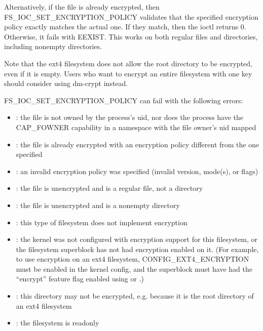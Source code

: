\documentclass[a4paper,8pt,english]{sphinxmanual}
\begin{document}
Alternatively, if the file is already encrypted, then
FS\_IOC\_SET\_ENCRYPTION\_POLICY validates that the specified encryption
policy exactly matches the actual one.  If they match, then the ioctl
returns 0.  Otherwise, it fails with EEXIST.  This works on both
regular files and directories, including nonempty directories.

Note that the ext4 filesystem does not allow the root directory to be
encrypted, even if it is empty.  Users who want to encrypt an entire
filesystem with one key should consider using dm-crypt instead.

FS\_IOC\_SET\_ENCRYPTION\_POLICY can fail with the following errors:
\begin{itemize}
\item {} 
: the file is not owned by the process's uid, nor does the
process have the CAP\_FOWNER capability in a namespace with the file
owner's uid mapped

\item {} 
: the file is already encrypted with an encryption policy
different from the one specified

\item {} 
: an invalid encryption policy was specified (invalid
version, mode(s), or flags)

\item {} 
: the file is unencrypted and is a regular file, not a
directory

\item {} 
: the file is unencrypted and is a nonempty directory

\item {} 
: this type of filesystem does not implement encryption

\item {} 
: the kernel was not configured with encryption
support for this filesystem, or the filesystem superblock has not
had encryption enabled on it.  (For example, to use encryption on an
ext4 filesystem, CONFIG\_EXT4\_ENCRYPTION must be enabled in the
kernel config, and the superblock must have had the ``encrypt''
feature flag enabled using  or .)

\item {} 
: this directory may not be encrypted, e.g. because it is
the root directory of an ext4 filesystem

\item {} 
: the filesystem is readonly

\end{itemize}
\end{document}
